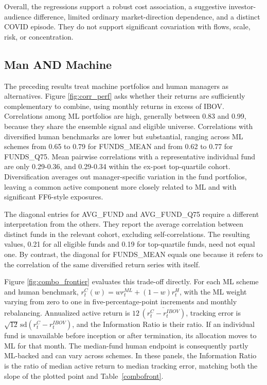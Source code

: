 \documentclass[preprint,12pt,authoryear]{elsarticle}
\begin{document}
Overall, the regressions support a robust cost association, a suggestive investor-audience difference, limited ordinary market-direction dependence, and a distinct COVID episode. They do not support significant covariation with flows, scale, risk, or concentration.



\subsection{Man AND Machine}\label{sec:man_machine}

The preceding results treat machine portfolios and human managers as alternatives. Figure \ref{fig:corr_perf} asks whether their returns are sufficiently complementary to combine, using monthly returns in excess of IBOV. Correlations among ML portfolios are high, generally between 0.83 and 0.99, because they share the ensemble signal and eligible universe. Correlations with diversified human benchmarks are lower but substantial, ranging across ML schemes from 0.65 to 0.79 for FUNDS\_MEAN and from 0.62 to 0.77 for FUNDS\_Q75. Mean pairwise correlations with a representative individual fund are only 0.29-0.36, and 0.29-0.34 within the ex-post top-quartile cohort. Diversification averages out manager-specific variation in the fund portfolios, leaving a common active component more closely related to ML and with significant FF6-style exposures.

The diagonal entries for AVG\_FUND and AVG\_FUND\_Q75 require a different interpretation from the others. They report the average correlation between distinct funds in the relevant cohort, excluding self-correlations. The resulting values, 0.21 for all eligible funds and 0.19 for top-quartile funds, need not equal one. By contrast, the diagonal for FUNDS\_MEAN equals one because it refers to the correlation of the same diversified return series with itself. 

Figure \ref{fig:combo_frontier} evaluates this trade-off directly. For each ML scheme and human benchmark, $r^{C}_{t}(w)=w r^{ML}_{t}+(1-w)r^{H}_{t}$, with the ML weight varying from zero to one in five-percentage-point increments and monthly rebalancing. Annualized active return is $12\,\overline{(r^{C}_{t}-r^{IBOV}_{t})}$, tracking error is $\sqrt{12}\,\mathrm{sd}(r^{C}_{t}-r^{IBOV}_{t})$, and the Information Ratio is their ratio. If an individual fund is unavailable before inception or after termination, its allocation moves to ML for that month. The median-fund human endpoint is consequently partly ML-backed and can vary across schemes. In these panels, the Information Ratio is the ratio of median active return to median tracking error, matching both the slope of the plotted point and Table~\ref{combofront}. 
\end{document}

